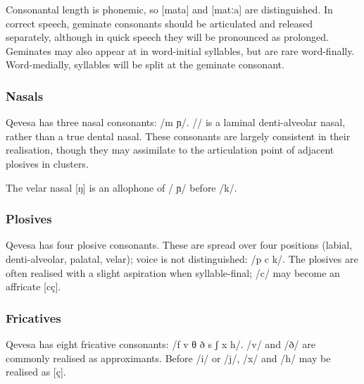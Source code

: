 \documentclass[grammar]{subfiles}
\begin{document}
  Consonantal length is phonemic, so [mata] and [matːa] are distinguished.  In
  correct speech, geminate consonants should be articulated and released
  separately, although in quick speech they will be pronounced as prolonged.
  Geminates may also appear at in word-initial syllables, but are rare
  word-finally.  Word-medially, syllables will be split at the geminate
  consonant.

  \subsubsection{Nasals}
  \label{sssec:nasals}

  Qevesa has three nasal consonants: /m  ɲ/.  // is a laminal
  denti-alveolar nasal, rather than a true dental nasal.  These consonants are
  largely consistent in their realisation, though they may assimilate to the
  articulation point of adjacent plosives in clusters. 

  The velar nasal [ŋ] is an allophone of / ɲ/ before /k/.

  \subsubsection{Plosives}
  \label{sssec:plosives}

  Qevesa has four plosive consonants.  These are spread over four positions
  (labial, denti-alveolar, palatal, velar); voice is not distinguished: /p
   c k/.  The plosives are often realised with a slight aspiration when
  syllable-final; /c/ may become an affricate [cç].  
  

  \subsubsection{Fricatives}
  \label{sssec:fricatives}

  Qevesa has eight fricative consonants: /f v θ ð s ʃ x h/.  /v/ and /ð/ are
  commonly realised as approximants. Before /i/ or /j/, /x/ and /h/ may be
  realised as [ç].
% 
\end{document}
